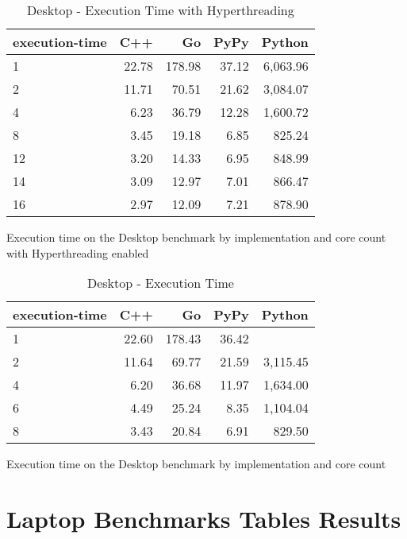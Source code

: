 \begin{table}[H]
 \centering
    \begin{tabular}{lrrrr}
    \hline
    execution-time & C++ & Go & PyPy & Python \\
    \hline
    1 & 22.78 & 178.98 & 37.12 & 6,063.96 \\
    2 & 11.71 & 70.51 & 21.62 & 3,084.07 \\
    4 & 6.23 & 36.79 & 12.28 & 1,600.72 \\
    8 & 3.45 & 19.18 & 6.85 & 825.24 \\
    12 & 3.20 & 14.33 & 6.95 & 848.99 \\
    14 & 3.09 & 12.97 & 7.01 & 866.47 \\
    16 & 2.97 & 12.09 & 7.21 & 878.90 \\
    \hline
    \end{tabular}
\caption{Desktop - Execution Time with Hyperthreading}{Execution time on the Desktop benchmark by implementation and core count with Hyperthreading enabled}
\label{tab:desktop-execution-time-hyperthreading}
\end{table}

\begin{table}[H]
    \centering
    \begin{tabular}{lrrrr}
        \hline
        execution-time & C++                 & Go          & PyPy       & Python              \\
        \hline
        1              & 22.60               & 178.43      & 36.42      &                    \\
        2              & 11.64               & 69.77       & 21.59      & 3,115.45           \\
        4              & 6.20                & 36.68       & 11.97      & 1,634.00           \\
        6              & 4.49                & 25.24       & 8.35       & 1,104.04           \\
        8	           & 3.43                & 20.84       & 6.91       & 829.50             \\
        \hline
    \end{tabular}
\caption{Desktop - Execution Time}{Execution time on the Desktop benchmark by implementation and core count}
\label{tab:desktop-execution-time}
\end{table}

\chapter{Laptop Benchmarks Tables Results}
\label{chap:appendix-laptop-benchmarks}

